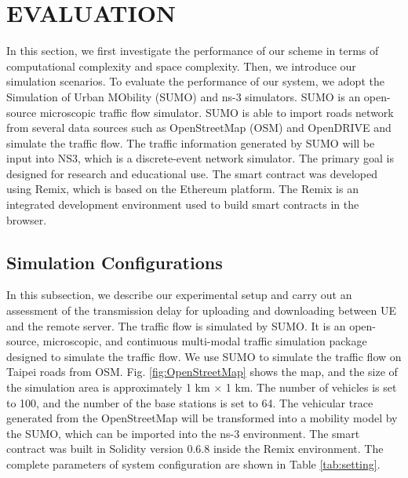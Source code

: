 \documentclass[journal,10pt]{IEEEtran}
\begin{document}


\section{EVALUATION}
In this section, we first investigate the performance of our scheme in terms of computational complexity and space complexity. Then, we introduce our simulation scenarios. To evaluate the performance of our system, we adopt the Simulation of Urban MObility (SUMO)\cite{sumo} and ns-3 \cite{ns3} simulators. SUMO is an open-source microscopic traffic flow simulator. SUMO is able to import roads network from several data sources such as OpenStreetMap (OSM) and OpenDRIVE and simulate the traffic flow. The traffic information generated by SUMO will be input into NS3, which is a discrete-event network simulator. The   primary goal is designed for research and educational use. 
The smart contract was developed using Remix, which is based on the Ethereum platform. The Remix is an integrated development environment used to build smart contracts in the browser. 

\subsection{Simulation Configurations}
In this subsection, we describe our experimental setup and carry out an assessment of the transmission delay for uploading and downloading between UE and the remote server.
The traffic flow is simulated by SUMO. It is an open-source, microscopic, and continuous multi-modal traffic simulation package designed to simulate the traffic flow. 
We use SUMO to simulate the traffic flow on Taipei roads from OSM. Fig. \ref{fig:OpenStreetMap} shows the map, and the size of the simulation area is approximately 1 km $\times$ 1 km. 
The number of vehicles is set to 100, and the number of the base stations is set to 64. The vehicular trace generated from the OpenStreetMap will be transformed into a mobility model by the SUMO, which can be imported into the ns-3 environment. The smart contract was built in Solidity version 0.6.8 inside the Remix environment. The complete parameters of system configuration are shown in Table \ref{tab:setting}. 
\end{document}
